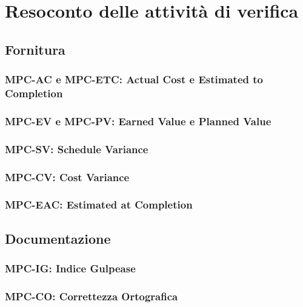 \section{Resoconto delle attività di verifica}

\subsection{Fornitura}

\subsubsection{MPC-AC e MPC-ETC: Actual Cost e Estimated to Completion}
\subsubsection{MPC-EV e MPC-PV: Earned Value e Planned Value}
\subsubsection{MPC-SV: Schedule Variance}
\subsubsection{MPC-CV: Cost Variance}
\subsubsection{MPC-EAC: Estimated at Completion}

\subsection{Documentazione}

\subsubsection{MPC-IG: Indice Gulpease}
\subsubsection{MPC-CO: Correttezza Ortografica}
